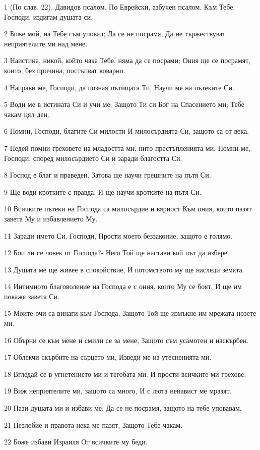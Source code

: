 \par 1 (По слав. 22). Давидов псалом. По Еврейски, азбучен псалом. Към Тебе, Господи, издигам душата си.
\par 2 Боже мой, на Тебе съм уповал; Да се не посрамя, Да не тържествуват неприятелите ми над мене.
\par 3 Наистина, никой, който чака Тебе, няма да се посрами; Ония ще се посрамят, които, без причина, постъпват коварно.
\par 4 Направи ме, Господи, да позная пътищата Ти, Научи ме на пътеките Си.
\par 5 Води ме в истината Си и учи ме; Защото Ти си Бог на Спасението ми; Тебе чакам цял ден.
\par 6 Помни, Господи, благите Си милости И милосърдията Си, защото са от века.
\par 7 Недей помни греховете на младостта ми, нито престъпленията ми; Помни ме, Господи, според милосърдието Си и заради благостта Си.
\par 8 Господ е благ и праведен. Затова ще научи грешните на пътя Си.
\par 9 Ще води кротките с правда. И ще научи кротките на пътя Си.
\par 10 Всичките пътеки на Господа са милосърдие и вярност Към ония, които пазят завета Му и избавлението Му.
\par 11 Заради името Си, Господи, Прости моето беззаконие, защото е голямо.
\par 12 Бои ли се човек от Господа?- Него Той ще настави кой път да избере.
\par 13 Душата ме ще живее в спокойствие, И потомството му ще наследи земята.
\par 14 Интимното благоволение на Господа е с ония, които Му се боят, И ще им покаже завета Си.
\par 15 Моите очи са винаги към Господа, Защото Той ще измъкне им мрежата нозете ми.
\par 16 Обърни се към мене и смили се за мене, Защото съм усамотен и наскърбен.
\par 17 Облекчи скърбите на сърцето ми, Изведи ме из утесненията ми.
\par 18 Вгледай се в угнетението ми и тегобата ми. И прости всичките ми грехове.
\par 19 Виж неприятелите ми, защото са много, И с люта ненавист ме мразят.
\par 20 Пази душата ми и избави ме; Да се не посрамя, защото на тебе уповавам.
\par 21 Незлобие и правота нека ме пазят, Защото Тебе чакам.
\par 22 Боже избави Израиля От всичките му беди.


